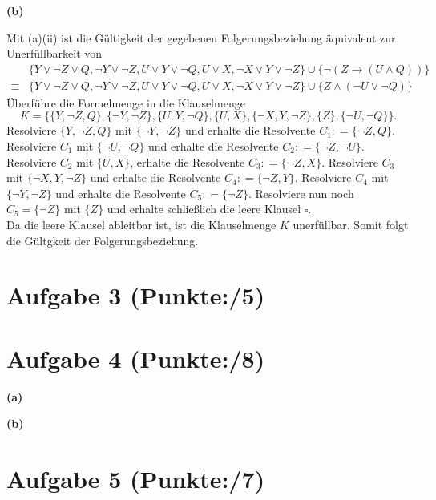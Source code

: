 \documentclass[11pt, a4paper]{article}
\newcommand{\pp}{5}
\newcommand{\ppp}{8}
\newcommand{\pppp}{7}
\newcommand{\defgr}{\mathrel{\mathop:\!\!=}}
\begin{document}
\textbf{(b)}
\begin{adjustwidth}{20pt}{20pt}
Mit (a)(ii) ist die Gültigkeit der gegebenen Folgerungsbeziehung äquivalent zur Unerfüllbarkeit von 
\begin{align*}
	& \{ Y \vee \neg Z \vee Q, \neg Y \vee \neg Z, U \vee Y \vee \neg Q, U \vee X, \neg X \vee Y \vee \neg Z\} \cup \{ \neg (Z \rightarrow (U \wedge Q))\}\\
	\equiv & \{ Y \vee \neg Z \vee Q, \neg Y \vee \neg Z, U \vee Y \vee \neg Q, U \vee X, \neg X \vee Y \vee \neg Z\} \cup \{ Z \wedge (\neg U \vee \neg Q)\}
\end{align*}
Überführe die Formelmenge in die Klauselmenge
\[
	K=\{ \{ Y, \neg Z, Q\}, \{ \neg Y, \neg Z\}, \{ U, Y, \neg Q\}, \{ U, X\}, \{\neg X, Y, \neg Z\}, \{ Z\}, \{ \neg U, \neg Q\} \}.
\]
Resolviere $\{ Y, \neg Z, Q\}$ mit $\{ \neg Y, \neg Z\}$ und erhalte die Resolvente $C_1\defgr\{\neg Z, Q\}$. Resolviere $C_1$ mit $\{ \neg U, \neg Q\}$ und erhalte die
Resolvente $C_2\defgr\{\neg Z, \neg U\}$. Resolviere $C_2$ mit $\{ U, X\}$, erhalte die Resolvente $C_3\defgr \{\neg Z, X\}$. Resolviere $C_3$ mit $\{\neg X, Y, \neg Z\}$ und
erhalte die Resolvente $C_4\defgr \{\neg Z, Y\}$. Resolviere $C_4$ mit $\{ \neg Y, \neg Z\}$ und erhalte die Resolvente $C_5\defgr \{ \neg Z\}$. Resolviere nun noch $C_5 = \{ \neg Z\}$
mit $\{ Z\}$ und erhalte schließlich die leere Klausel $\square$.\\
Da die leere Klausel ableitbar ist, ist die Klauselmenge $K$ unerfüllbar. Somit folgt die Gültgkeit der Folgerungsbeziehung.
\end{adjustwidth}
\section*{Aufgabe 3 (Punkte:\qquad/\pp)}

\begin{adjustwidth}{20pt}{20pt}

\end{adjustwidth}





\section*{Aufgabe 4 (Punkte:\qquad/\ppp)}
\textbf{(a)}
\begin{adjustwidth}{20pt}{20pt}


\end{adjustwidth}
\textbf{(b)}
\begin{adjustwidth}{20pt}{20pt}


\end{adjustwidth}


\section*{Aufgabe 5 (Punkte:\qquad/\pppp)}

\begin{adjustwidth}{20pt}{20pt}

\end{adjustwidth}
\end{document}
